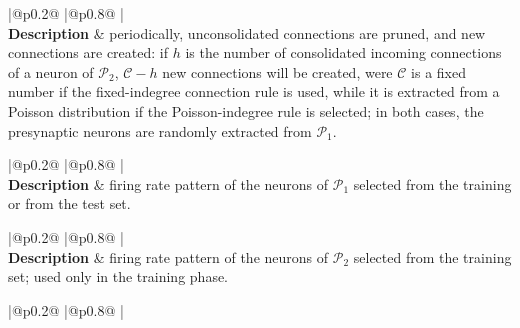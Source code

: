 \documentclass[a4paper, 12pt, twoside, openright]{book}
\newcommand{\popI}{\mathcal{P}_1}
\newcommand{\popII}{\mathcal{P}_2}
\newcommand{\C}{\mathcal{C}}
\def\marg{2pt}
\begin{document}
\begin{table}[H]
\begin{tabular}{
  |@{\hspace*{\marg}}p{}@{\hspace*{\marg}}
  |@{\hspace*{\marg}}p{}@{\hspace*{\marg}}
  |}
  \\
  \hline 
  \textbf{Description} & periodically, unconsolidated connections are pruned, and new connections are created: if $h$ is the number of consolidated incoming connections of a neuron of $\popII$, $\C - h$ new connections will be created, were $\C$ is a fixed number if the fixed-indegree connection rule is used, while it is extracted from a Poisson distribution if the Poisson-indegree rule is selected; in both cases, the presynaptic neurons are randomly extracted from $\popI$.
  \\
  \hline 
\end{tabular}
\begin{tabular}{
  |@{\hspace*{\marg}}p{}@{\hspace*{\marg}}
  |@{\hspace*{\marg}}p{}@{\hspace*{\marg}}
  |}
  \hline 
  \\
\hline 
\textbf{Description} & firing rate pattern of the neurons of $\popI$ selected from the training or from the test set.\\
\hline 
\end{tabular}
\begin{tabular}{
  |@{\hspace*{\marg}}p{}@{\hspace*{\marg}}
  |@{\hspace*{\marg}}p{}@{\hspace*{\marg}}
  |}
  \hline 
  \\
\hline 
\textbf{Description} & firing rate pattern of the neurons of $\popII$ selected from the training set; used only in the training phase.\\
\hline 
\end{tabular}
\begin{tabular}{
  |@{\hspace*{\marg}}p{}@{\hspace*{\marg}}
  |@{\hspace*{\marg}}p{}@{\hspace*{\marg}}
  |}
  \hline 
\end{tabular}
\end{table}
\end{document}
